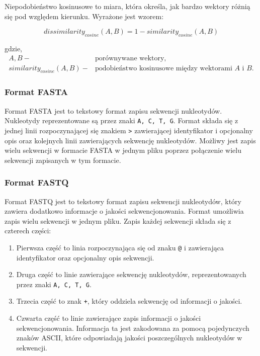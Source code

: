             Niepodobieństwo kosinusowe to miara, która określa, jak bardzo wektory różnią się pod względem kierunku. Wyrażone jest wzorem:

            \begin{equation}
                dissimilarity_{cosine}(A, B) = 1 - similarity_{cosine}(A, B)
                \label{Equation:CosineDissimilarity}
            \end{equation}

            gdzie,
            \begin{align*}
                A, B -& \text{porównywane wektory,} \\
                similarity_{cosine}(A, B) -& \text{podobieństwo kosinusowe między wektorami $A$ i $B$.}
            \end{align*}

        \subsubsection{Format FASTA}

            Format FASTA jest to tekstowy format zapisu sekwencji nukleotydów. Nukleotydy reprezentowane są przez znaki \texttt{A, C, T, G}. Format składa się z jednej linii rozpoczynającej się znakiem \texttt{>} zawierającej identyfikator i opcjonalny opis oraz kolejnych linii zawierających sekwencję nukleotydów. Możliwy jest zapis wielu sekwencji w formacie FASTA w jednym pliku poprzez połączenie wielu sekwencji zapisanych w tym formacie.

        \subsubsection{Format FASTQ} 

            Format FASTQ jest to tekstowy format zapisu sekwencji nukleotydów, który zawiera dodatkowo informacje o jakości sekwencjonowania. Format umożliwia zapis wielu sekwencji w jednym pliku. Zapis każdej sekwencji składa się z czterech części: 
            \begin{enumerate}
                \item {
                    Pierwsza część to linia rozpoczynająca się od znaku \texttt{@} i zawierająca identyfikator oraz opcjonalny opis sekwencji.
                }
                \item {
                    Druga część to linie zawierające sekwencję nukleotydów, reprezentowanych przez znaki \texttt{A, C, T, G}.
                }
                \item {
                    Trzecia część to znak \texttt{+}, który oddziela sekwencję od informacji o jakości.
                }
                \item {
                    Czwarta część to linie zawierające zapis informacji o jakości sekwencjonowania. Informacja ta jest zakodowana za pomocą pojedynczych znaków ASCII, które odpowiadają jakości poszczególnych nukleotydów w sekwencji.
                }
            \end{enumerate}

